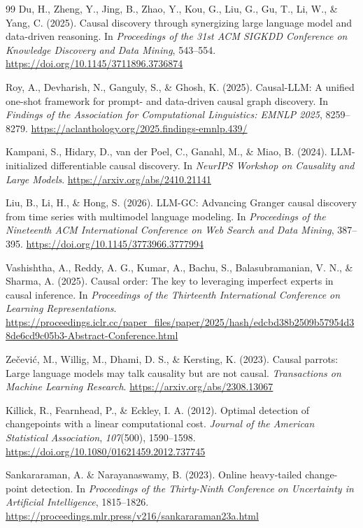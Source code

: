 \begin{thebibliography}{99}
 Du, H., Zheng, Y., Jing, B., Zhao, Y., Kou, G., Liu, G., Gu, T., Li, W., \& Yang, C. (2025). Causal discovery through synergizing large language model and data-driven reasoning. In \textit{Proceedings of the 31st ACM SIGKDD Conference on Knowledge Discovery and Data Mining}, 543--554. \url{https://doi.org/10.1145/3711896.3736874}

 Roy, A., Devharish, N., Ganguly, S., \& Ghosh, K. (2025). Causal-LLM: A unified one-shot framework for prompt- and data-driven causal graph discovery. In \textit{Findings of the Association for Computational Linguistics: EMNLP 2025}, 8259--8279. \url{https://aclanthology.org/2025.findings-emnlp.439/}

 Kampani, S., Hidary, D., van der Poel, C., Ganahl, M., \& Miao, B. (2024). LLM-initialized differentiable causal discovery. In \textit{NeurIPS Workshop on Causality and Large Models}. \url{https://arxiv.org/abs/2410.21141}

 Liu, B., Li, H., \& Hong, S. (2026). LLM-GC: Advancing Granger causal discovery from time series with multimodel language modeling. In \textit{Proceedings of the Nineteenth ACM International Conference on Web Search and Data Mining}, 387--395. \url{https://doi.org/10.1145/3773966.3777994}

 Vashishtha, A., Reddy, A. G., Kumar, A., Bachu, S., Balasubramanian, V. N., \& Sharma, A. (2025). Causal order: The key to leveraging imperfect experts in causal inference. In \textit{Proceedings of the Thirteenth International Conference on Learning Representations}. \url{https://proceedings.iclr.cc/paper_files/paper/2025/hash/edcbd38b2509b57954d38de6cd9c05b3-Abstract-Conference.html}

 Ze{\v{c}}evi{\'c}, M., Willig, M., Dhami, D. S., \& Kersting, K. (2023). Causal parrots: Large language models may talk causality but are not causal. \textit{Transactions on Machine Learning Research}. \url{https://arxiv.org/abs/2308.13067}

 Killick, R., Fearnhead, P., \& Eckley, I. A. (2012). Optimal detection of changepoints with a linear computational cost. \textit{Journal of the American Statistical Association}, \textit{107}(500), 1590--1598. \url{https://doi.org/10.1080/01621459.2012.737745}

 Sankararaman, A. \& Narayanaswamy, B. (2023). Online heavy-tailed change-point detection. In \textit{Proceedings of the Thirty-Ninth Conference on Uncertainty in Artificial Intelligence}, 1815--1826. \url{https://proceedings.mlr.press/v216/sankararaman23a.html}


\end{thebibliography}
